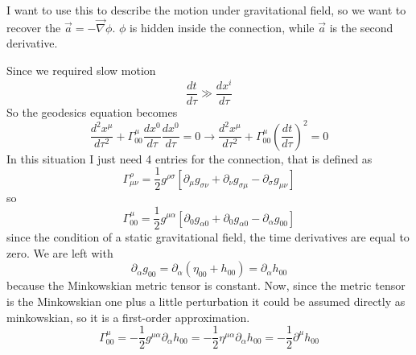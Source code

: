 I want to use this to describe the motion under gravitational field, so we want to recover the $\vec{a} = -\vec{\nabla } \phi $. $\phi $ is hidden inside the connection, while $\vec{a}$ is the second derivative. \par
Since we required slow motion 
\[
\frac{d t}{d \tau } \gg \frac{d x^{i}}{d \tau }	
\]
So the geodesics equation becomes
\begin{equation}
\frac{d ^{2}x^{\mu }}{d \tau ^{2}} + \Gamma ^{\mu }_{00}\frac{d x^{0}}{d \tau }\frac{d x^{0}}{d \tau } = 0 \to  \frac{d ^{2}x^{\mu }}{d \tau ^{2}} + \Gamma ^{\mu }_{00}\left( \frac{d t}{d \tau } \right)^{2} = 0
\end{equation}
In this situation I just need 4 entries for the connection, that is defined as
\[
	\Gamma ^{\rho }_{\mu \nu } = \frac{1}{2} g^{\rho \sigma }\left[ \partial_{\mu } g_{\sigma\nu } + \partial_{\nu }g_{\sigma \mu } - \partial_{\sigma }g_{\mu \nu } \right]
\]
so
\begin{equation}
	\Gamma ^{\mu }_{00} = \frac{1}{2} g^{\mu \alpha } \left[ \partial_{0}g_{\alpha 0} + \partial_{0}g_{\alpha 0} - \partial_{\alpha }g_{00} \right]
\end{equation}
since the condition of a static gravitational field, the time derivatives are equal to zero. We are left with 
\[
\partial_{\alpha }g_{00} = \partial_{\alpha }\left( \eta _{00} + h_{00} \right) = \partial_{\alpha }h_{00}
\]
because the Minkowskian metric tensor is constant.
Now, since the metric tensor is the Minkowskian one plus a little perturbation it could be
assumed directly as minkowskian, so it is a first-order approximation.
\begin{equation}
\Gamma ^{\mu }_{00} = -\frac{1}{2} g^{\mu \alpha } \partial_{\alpha }h_{00} = - \frac{1}{2}\eta ^{\mu \alpha } \partial_{\alpha }h_{00} = - \frac{1}{2} \partial^{\mu }h_{00}	
\end{equation}

